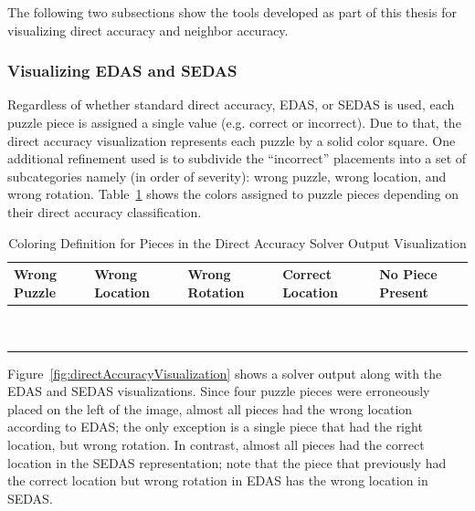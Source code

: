 \documentclass{report}
\begin{document}
The following two subsections show the tools developed as part of this thesis for visualizing direct accuracy and neighbor accuracy.

\subsubsection{Visualizing EDAS and SEDAS}\label{sec:visualizingEdasSedas}

Regardless of whether standard direct accuracy, EDAS, or SEDAS is used, each puzzle piece is assigned a single value (e.g. correct or incorrect).  Due to that, the direct accuracy visualization represents each puzzle by a solid color square.  One additional refinement used is to subdivide the ``incorrect'' placements into a set of subcategories namely (in order of severity): wrong puzzle, wrong location, and wrong rotation.  Table~\ref{tab:directAccuracyColors} shows the colors assigned to puzzle pieces depending on their direct accuracy classification.

\begin{table}[h]

\begin{center}
  \begin{tabular}{ | >{\centering\arraybackslash}m{0.6in} | >{\centering\arraybackslash}m{0.6in} | >{\centering\arraybackslash}m{0.6in} | >{\centering\arraybackslash}m{0.6in} | >{\centering\arraybackslash}m{0.6in} | }
 \hline
    Wrong Puzzle & Wrong Location & Wrong Rotation & Correct Location  & No Piece Present  \\ \hline
	{\cellcolor{blue}~} & {\cellcolor{red}~}  & {\cellcolor{orange}~}  & {\cellcolor{green}~} & {\cellcolor{black}~}  \\
	{\cellcolor{blue}~} & {\cellcolor{red}~}  & {\cellcolor{orange}~}  & {\cellcolor{green}~} & {\cellcolor{black}~} \\
 \hline
  \end{tabular}
\end{center}
\caption{Coloring Definition for Pieces in the Direct Accuracy Solver Output Visualization}\label{tab:directAccuracyColors}
\end{table}

Figure~\ref{fig:directAccuracyVisualization} shows a solver output along with the EDAS and SEDAS visualizations. Since four puzzle pieces were erroneously placed on the left of the image, almost all pieces had the wrong location according to EDAS; the only exception is a single piece that had the right location, but wrong rotation.  In contrast, almost all pieces had the correct location in the SEDAS representation; note that the piece that previously had the correct location but wrong rotation in EDAS has the wrong location in SEDAS.
\end{document}
